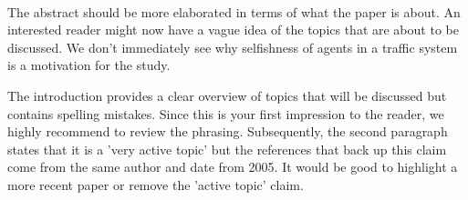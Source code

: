 \documentclass[../review.tex]{subfiles}
\begin{document}
\\
The abstract should be more elaborated in terms of what the paper is about. An interested reader might now have a vague idea of the topics that are about to be discussed.  We don't immediately see why selfishness of agents in a traffic system is a motivation for the study.

The introduction provides a clear overview of topics that will be discussed but contains spelling mistakes. Since this is your first impression to the reader, we highly recommend to review the phrasing. Subsequently, the second paragraph states that it is a 'very active topic' but the references that back up this claim come from the same author and date from 2005. It would be good to highlight a more recent paper or remove the 'active topic' claim.
\end{document}
